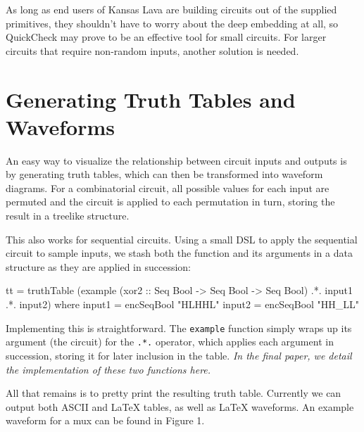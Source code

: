 \documentclass{llncs}
\begin{document}
As long as end users of Kansas Lava are building circuits out
of the supplied primitives, they shouldn't have to worry about
the deep embedding at all, so QuickCheck may prove to be an
effective tool for small circuits. For larger circuits that
require non-random inputs, another solution is needed.

\section{Generating Truth Tables and Waveforms}
\label{sec:waveforms}

An easy way to visualize the relationship between circuit inputs and
outputs is by generating truth tables, which can then be transformed
into waveform diagrams. For a combinatorial circuit, all possible
values for each input are permuted and the circuit is applied to each
permutation in turn, storing the result in a treelike structure.

This also works for sequential circuits. Using a small DSL to apply the sequential
circuit to sample inputs, we stash both the function and its arguments
in a data structure as they are applied in succession:

\begin{code}
tt = truthTable (example (xor2 :: Seq Bool -> Seq Bool -> Seq Bool)
                .*. input1
                .*. input2)
        where
                input1 = encSeqBool "HLHHL"
                input2 = encSeqBool "HH_LL"
\end{code}

Implementing this is straightforward. The \verb!example! function simply
wraps up its argument (the circuit) for the \verb!.*.! operator, which applies
each argument in succession, storing it for later inclusion in the table. 
\emph{In the final paper, we detail the implementation of these two functions here.}

All that remains is to pretty print the resulting truth table.
Currently we can output both ASCII and \LaTeX \hspace{1pt} tables, as well as \LaTeX \hspace{1pt} waveforms.
An example waveform for a mux can be found in Figure 1. %
\end{document}
